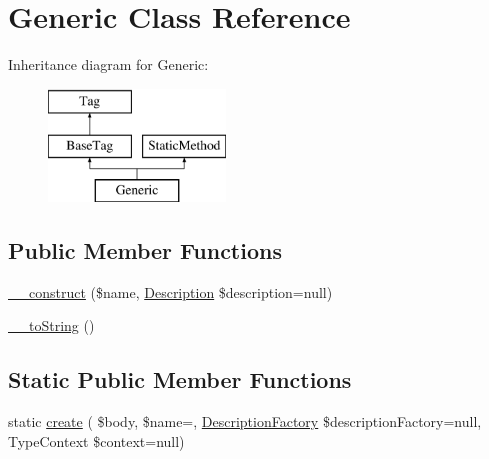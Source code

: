 \hypertarget{classphp_documentor_1_1_reflection_1_1_doc_block_1_1_tags_1_1_generic}{}\section{Generic Class Reference}
\label{classphp_documentor_1_1_reflection_1_1_doc_block_1_1_tags_1_1_generic}
Inheritance diagram for Generic\+:\begin{figure}[H]
\begin{center}
\leavevmode
\includegraphics[height=3.000000cm]{classphp_documentor_1_1_reflection_1_1_doc_block_1_1_tags_1_1_generic}
\end{center}
\end{figure}
\subsection*{Public Member Functions}
\begin{DoxyCompactItemize}
\item 
\mbox{\hyperlink{classphp_documentor_1_1_reflection_1_1_doc_block_1_1_tags_1_1_generic_a3a9679b2e4e16dbed1d11a8fdff38c1c}{\+\_\+\+\_\+construct}} (\$name, \mbox{\hyperlink{classphp_documentor_1_1_reflection_1_1_doc_block_1_1_description}{Description}} \$description=null)
\item 
\mbox{\hyperlink{classphp_documentor_1_1_reflection_1_1_doc_block_1_1_tags_1_1_generic_a7516ca30af0db3cdbf9a7739b48ce91d}{\+\_\+\+\_\+to\+String}} ()
\end{DoxyCompactItemize}
\subsection*{Static Public Member Functions}
\begin{DoxyCompactItemize}
\item 
static \mbox{\hyperlink{classphp_documentor_1_1_reflection_1_1_doc_block_1_1_tags_1_1_generic_a48abcbbb884a56e37f973dd7d7322dfd}{create}} ( \$body, \$name=\textquotesingle{}\textquotesingle{}, \mbox{\hyperlink{classphp_documentor_1_1_reflection_1_1_doc_block_1_1_description_factory}{Description\+Factory}} \$description\+Factory=null, Type\+Context \$context=null)
\end{DoxyCompactItemize}
